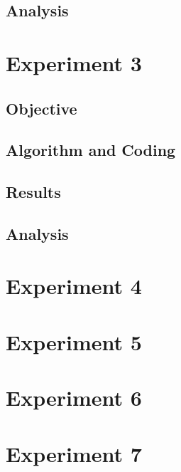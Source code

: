 \subsection{Analysis}\label{subsec:analysis2}

\section{Experiment 3}\label{sec:experiment3}

\subsection{Objective}\label{subsec:objective3}
\subsection{Algorithm and Coding}\label{subsec:algAndCoding3}
\subsection{Results}\label{subsec:results3}
\subsection{Analysis}\label{subsec:analysis3}

\section{Experiment 4} \label{sec:experiment4}

\section{Experiment 5} \label{sec:experiment5}

\section{Experiment 6} \label{sec:experiment6}

\section{Experiment 7} \label{sec:experiment7}
